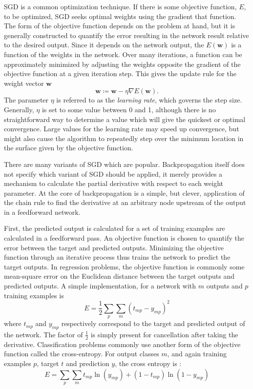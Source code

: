 SGD is a common optimization technique.  If there is some objective function,
$E$, to be optimized, SGD seeks optimal weights using the gradient that
function.
The form of the objective function depends on the problem at hand,
but it is generally constructed to quantify the error resulting in
the network result relative to the desired output.
Since it depends on the network output, the $E(\mathbf{w})$ is a function
of the weights in the network.
Over many iterations, a function can be approximately minimized by adjusting
the weights opposite the gradient of the objective function at a given
iteration step.  This gives the update rule for the weight vector $\mathbf{w}$
\begin{equation}
\mathbf{w} \coloneqq \mathbf{w} - \eta \nabla E(\mathbf{w}).
\end{equation}
The parameter $\eta$ is referred to as the \textit{learning rate}, which governs the step size.  Generally, $\eta$ is set to some value between 0 and 1, although there is no straightforward way to determine a value which will give the quickest or optimal convergence.  Large values for the learning rate may speed up convergence, but might also cause the algorithm to repeatedly step over the minimum location in the surface given by the objective function.

There are many variants of SGD which are popular.  Backpropagation itself does not specify which variant of SGD should be applied, it merely provides a mechanism to calculate the partial derivative with respect to each weight parameter.  At the core of backpropagation is a simple, but clever, application of the chain rule to find the derivative at an arbitrary node upstream of the output in a feedforward network.

First, the predicted output is calculated for a set of training examples are calculated in a feedforward pass.  An objective function is chosen to quantify the error between the target and predicted outputs.  Minimizing the objective function through an iterative process thus trains the network to predict the target outputs.  In regression problems, the objective function is commonly some mean-square error on the Euclidean distance between the target outputs and predicted outputs.
A simple implementation, for a network with  $m$ outputs and $p$ training
examples is
\begin{equation} E = \frac12 \sum_p \sum_m (t_{mp} - y_{mp})^2
\label{rmse}
\end{equation}
where $t_{mp}$ and $y_{mp}$ respectively correspond to the target and predicted output of the network.  The factor of $\frac12$ is simply present for cancellation after taking the derivative.  Classification problems commonly use another form of the objective function called the cross-entropy.  For output classes $m$, and again training examples $p$, target $t$ and prediction $y$, the cross entropy is \cite{reed1999neural}:
\begin{equation}
E = \sum_p \sum_m t_{mp} \ln(y_{mp}) + (1-t_{mp})\ln(1-y_{mp})
\end{equation}

